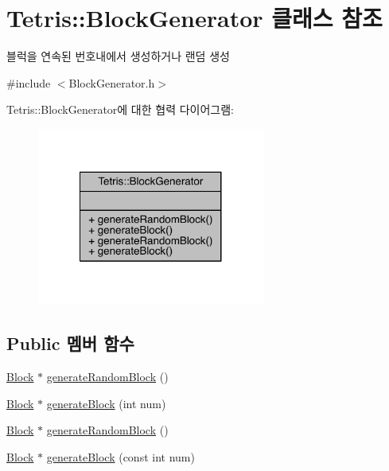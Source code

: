 \hypertarget{class_tetris_1_1_block_generator}{}\section{Tetris\+:\+:Block\+Generator 클래스 참조}
\label{class_tetris_1_1_block_generator}


블럭을 연속된 번호내에서 생성하거나 랜덤 생성  




{\ttfamily \#include $<$Block\+Generator.\+h$>$}



Tetris\+:\+:Block\+Generator에 대한 협력 다이어그램\+:
\nopagebreak
\begin{figure}[H]
\begin{center}
\leavevmode
\includegraphics[width=212pt]{class_tetris_1_1_block_generator__coll__graph}
\end{center}
\end{figure}
\subsection*{Public 멤버 함수}
\begin{DoxyCompactItemize}
\item 
\hyperlink{class_tetris_1_1_block}{Block} $\ast$ \hyperlink{class_tetris_1_1_block_generator_a10dfe1467d40437ad41c5ae76437ad78}{generate\+Random\+Block} ()
\item 
\hyperlink{class_tetris_1_1_block}{Block} $\ast$ \hyperlink{class_tetris_1_1_block_generator_a581b22cebe170d3fe8b51130c01e7a22}{generate\+Block} (int num)
\item 
\hyperlink{class_tetris_1_1_block}{Block} $\ast$ \hyperlink{class_tetris_1_1_block_generator_a434df5baf3944a534492b63763b532a6}{generate\+Random\+Block} ()
\item 
\hyperlink{class_tetris_1_1_block}{Block} $\ast$ \hyperlink{class_tetris_1_1_block_generator_a584fde2bfe1cdd4505bd905befd73d21}{generate\+Block} (const int num)
\end{DoxyCompactItemize}


